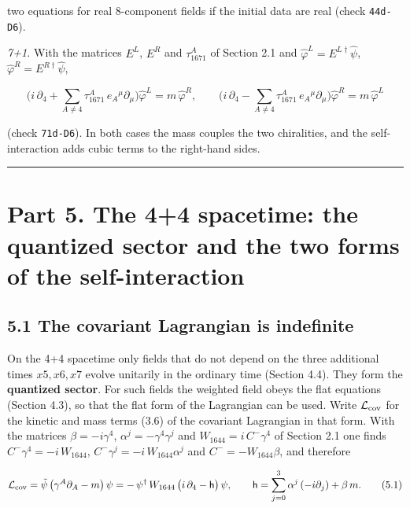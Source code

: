 \documentclass[
  10pt,
]{article}
\begin{document}
two equations for real 8-component fields if the initial data are real
(check \texttt{44d-D6}).

\emph{7+1.} With the matrices \(E^L\), \(E^R\) and \(\tau_{1671}^A\) of
Section 2.1 and \(\hat\varphi^{L}=E^{L\dagger}\hat\psi\),
\(\hat\varphi^{R}=E^{R\dagger}\hat\psi\),

\[\Big(i\,\partial_4+\sum_{A\neq4}\tau_{1671}^A\,e_A{}^\mu\partial_\mu\Big)\hat\varphi^L=m\,\hat\varphi^R,\qquad
\Big(i\,\partial_4-\sum_{A\neq4}\tau_{1671}^A\,e_A{}^\mu\partial_\mu\Big)\hat\varphi^R=m\,\hat\varphi^L\tag{4.15}\]

(check \texttt{71d-D6}). In both cases the mass couples the two
chiralities, and the self-interaction adds cubic terms to the right-hand
sides.

\begin{center}\rule{0.5\linewidth}{0.5pt}\end{center}

\hypertarget{part-5.-the-44-spacetime-the-quantized-sector-and-the-two-forms-of-the-self-interaction}{%
\section{Part 5. The 4+4 spacetime: the quantized sector and the two
forms of the
self-interaction}\label{part-5.-the-44-spacetime-the-quantized-sector-and-the-two-forms-of-the-self-interaction}}

\hypertarget{the-covariant-lagrangian-is-indefinite}{%
\subsection{5.1 The covariant Lagrangian is
indefinite}\label{the-covariant-lagrangian-is-indefinite}}

On the 4+4 spacetime only fields that do not depend on the three
additional times \(x5,x6,x7\) evolve unitarily in the ordinary time
(Section 4.4). They form the \textbf{quantized sector}. For such fields
the weighted field obeys the flat equations (Section 4.3), so that the
flat form of the Lagrangian can be used. Write \(\mathcal L_{\rm cov}\)
for the kinetic and mass terms (3.6) of the covariant Lagrangian in that
form. With the matrices \(\beta=-i\gamma^4\),
\(\alpha^j=-\gamma^4\gamma^j\) and \(W_{1644}=i\,C^-\gamma^4\) of
Section 2.1 one finds \(C^-\gamma^4=-i\,W_{1644}\),
\(C^-\gamma^j=-i\,W_{1644}\alpha^j\) and \(C^-=-W_{1644}\beta\), and
therefore

\[\mathcal L_{\rm cov}=\tilde\psi\,\big(\gamma^A\partial_A-m\big)\,\psi=-\,\psi^\dagger\,W_{1644}\,\big(i\,\partial_4-\mathsf h\big)\,\psi,
\qquad\mathsf h=\sum_{j=0}^{3}\alpha^j\,(-i\partial_j)+\beta\,m.\tag{5.1}\]
\end{document}
